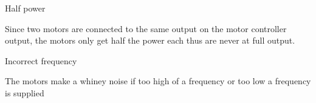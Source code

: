 \begin{DoxyEnumerate}
\item Half power
\begin{DoxyItemize}
\item Since two motors are connected to the same output on the motor controller output, the motors only get half the power each thus are never at full output.
\end{DoxyItemize}
\item Incorrect frequency
\begin{DoxyItemize}
\item The motors make a whiney noise if too high of a frequency or too low a frequency is supplied 
\end{DoxyItemize}
\end{DoxyEnumerate}